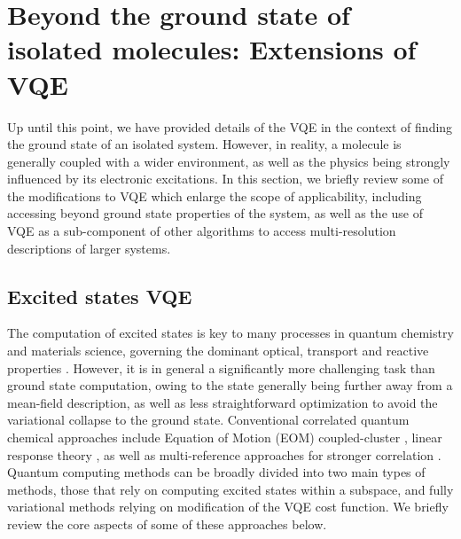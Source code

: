 \section{Beyond the ground state of isolated molecules: Extensions of VQE} \label{sec:Extensions_of_VQE}

Up until this point, we have provided details of the VQE in the context of finding the ground state of an isolated system. However, in reality, a molecule is generally coupled with a wider environment, as well as the physics being strongly influenced by its electronic excitations. In this section, we briefly review some of the modifications to VQE which enlarge the scope of applicability, including accessing beyond ground state properties of the system, as well as the use of VQE as a sub-component of other algorithms to access multi-resolution descriptions of larger systems.

\subsection{Excited states VQE} \label{sec:excited_states}

The computation of excited states is key to many processes in quantum chemistry and materials science, governing the dominant optical, transport and reactive properties \cite{Karim2018, ZeinalipourYazdi2018}. However, it is in general a significantly more challenging task than ground state computation, owing to the state generally being further away from a mean-field description, as well as less straightforward optimization to avoid the variational collapse to the ground state. Conventional correlated quantum chemical approaches \cite{Matsika2018} include Equation of Motion (EOM) coupled-cluster \cite{Stanton1993}, linear response theory \cite{Monkhorst2009}, as well as multi-reference approaches for stronger correlation \cite{Jeziorski1981, Lyakh2011}. Quantum computing methods can be broadly divided into two main types of methods, those that rely on computing excited states within a subspace, and fully variational methods relying on modification of the VQE cost function. We briefly review the core aspects of some of these approaches below.

